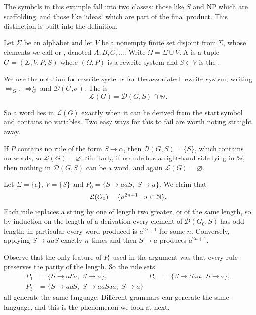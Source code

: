 \documentclass[a4paper]{scrartcl}
\newcommand{\WW}{\mathbb{W}}
\newcommand{\lang}{\mathcal{L}}
\newcommand{\der}{\mathcal{D}}
\begin{document}
The symbols in this example fall into two classes: those like $S$ and NP which are scaffolding, and those like `ideas' which are part of the final product. This distinction is built into the definition.

\begin{definition}[Grammar]
	Let $\Sigma$ be an alphabet and let $V$ be a nonempty finite set disjoint from $\Sigma$, whose elements we call  or , denoted $A, B, C, \dots$. Write $\Omega = \Sigma \cup V$. A  is a tuple $G = (\Sigma, V, P, S)$ where $(\Omega, P)$ is a rewrite system and $S \in V$ is the .

	We use the notation for rewrite systems for the associated rewrite system, writing $\Rightarrow_G$, $\Rightarrow_G^\star$ and $\der(G, \sigma)$. The  is
	$$\lang(G) = \der(G, S) \cap \WW.$$
\end{definition}

So a word lies in $\lang(G)$ exactly when it can be derived from the start symbol and contains no variables. Two easy ways for this to fail are worth noting straight away.

\begin{example}
	If $P$ contains no rule of the form $S \to \alpha$, then $\der(G,S) = \{S\}$, which contains no words, so $\lang(G) = \varnothing$. Similarly, if no rule has a right-hand side lying in $\WW$, then nothing in $\der(G,S)$ can be a word, and again $\lang(G) = \varnothing$.
\end{example}

\begin{example}\label{ex:oddas}
	Let $\Sigma = \{a\}$, $V = \{S\}$ and $P_0 = \{S \to aaS,\; S \to a\}$. We claim that
	$$\lang(G_0) = \{a^{2n+1} \mid n \in \N\}.$$
	Each rule replaces a string by one of length two greater, or of the same length, so by induction on the length of a derivation every element of $\der(G_0, S)$ has odd length; in particular every word produced is $a^{2n+1}$ for some $n$. Conversely, applying $S \to aaS$ exactly $n$ times and then $S \to a$ produces $a^{2n+1}$.

	Observe that the only feature of $P_0$ used in the argument was that every rule preserves the parity of the length. So the rule sets
	\begin{align*}
		P_1 &= \{S \to aSa,\; S \to a\}, & P_2 &= \{S \to Saa,\; S \to a\}, \\
		P_3 &= \{S \to aaS,\; S \to aaSaa,\; S \to a\}
	\end{align*}
	all generate the same language. Different grammars can generate the same language, and this is the phenomenon we look at next.
\end{example}
\end{document}
